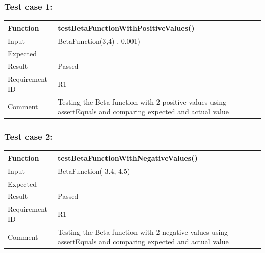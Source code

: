 \documentclass[letterpaper, 11pt]{article}
\begin{document}
        \subsubsection{\textbf{Test case 1:}} 
            \setlength{\tabcolsep}{25pt}
            \renewcommand{\arraystretch}{1.5}
            \begin{tabularx}{1.0\textwidth} { 
                  | >{\raggedright\arraybackslash}X 
                  | >{\raggedright\arraybackslash}X | }
                 \hline
                 Function & testBetaFunctionWithPositiveValues()\\
                 \hline
                 Input  & BetaFunction(3,4) , 0.001)\\
                  \hline
                 Expected  & 0.0166667\\
                  \hline
                 Result  & Passed\\
                  \hline
                 Requirement ID  & R1\\
                   \hline
                 Comment  & Testing the Beta function with 2 positive values using assertEquals and comparing expected and actual value\\
                \hline
            \end{tabularx}
        \subsubsection{\textbf{Test case 2:}} 
            \setlength{\tabcolsep}{25pt}
            \renewcommand{\arraystretch}{1.5}
            \begin{tabularx}{1.0\textwidth} { 
                  | >{\raggedright\arraybackslash}X 
                  | >{\raggedright\arraybackslash}X | }
                 \hline
                 Function & testBetaFunctionWithNegativeValues()\\
                 \hline
                 Input  & BetaFunction(-3.4,-4.5)\\
                  \hline
                 Expected  & -1\\
                  \hline
                 Result  & Passed\\
                  \hline
                 Requirement ID  & R1\\
                    \hline
                 Comment  & Testing the Beta function with 2 negative values using assertEquals and comparing expected and actual value\\
                \hline
            \end{tabularx} 
\end{document}
